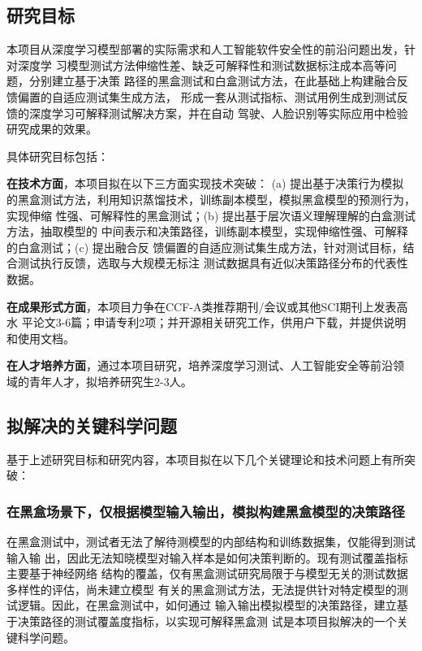 \subsection{研究目标}\label{ch2target}

本项目从深度学习模型部署的实际需求和人工智能软件安全性的前沿问题出发，针对深度学
习模型测试方法伸缩性差、缺乏可解释性和测试数据标注成本高等问题，分别建立基于决策
路径的黑盒测试和白盒测试方法，在此基础上构建融合反馈偏置的自适应测试集生成方法，
形成一套从测试指标、测试用例生成到测试反馈的深度学习可解释测试解决方案，并在自动
驾驶、人脸识别等实际应用中检验研究成果的效果。

具体研究目标包括：

\textbf{在技术方面}，本项目拟在以下三方面实现技术突破： (a) 提出基于决策行为模拟
的黑盒测试方法，利用知识蒸馏技术，训练副本模型，模拟黑盒模型的预测行为，实现伸缩
性强、可解释性的黑盒测试；(b) 提出基于层次语义理解理解的白盒测试方法，抽取模型的
中间表示和决策路径，训练副本模型，实现伸缩性强、可解释的白盒测试；(c) 提出融合反
馈偏置的自适应测试集生成方法，针对测试目标，结合测试执行反馈，选取与大规模无标注
测试数据具有近似决策路径分布的代表性数据。

\textbf{在成果形式方面}，本项目力争在CCF-A类推荐期刊/会议或其他SCI期刊上发表高水
平论文3-6篇；申请专利2项；并开源相关研究工作，供用户下载，并提供说明和使用文档。

\textbf{在人才培养方面}，通过本项目研究，培养深度学习测试、人工智能安全等前沿领
域的青年人才，拟培养研究生2-3人。

\subsection{拟解决的关键科学问题}

基于上述研究目标和研究内容，本项目拟在以下几个关键理论和技术问题上有所突破：

\subsubsection{在黑盒场景下，仅根据模型输入输出，模拟构建黑盒模型的决策路径}

在黑盒测试中，测试者无法了解待测模型的内部结构和训练数据集，仅能得到测试输入输
出，因此无法知晓模型对输入样本是如何决策判断的。现有测试覆盖指标主要基于神经网络
结构的覆盖，仅有黑盒测试研究局限于与模型无关的测试数据多样性的评估，尚未建立模型
有关的黑盒测试方法，无法提供针对特定模型的测试逻辑。因此，在黑盒测试中，如何通过
输入输出模拟模型的决策路径，建立基于决策路径的测试覆盖度指标，以实现可解释黑盒测
试是本项目拟解决的一个关键科学问题。


